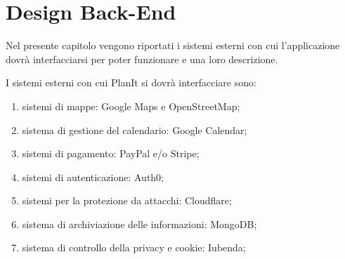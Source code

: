 \section{Design Back-End}
\label{secD1:RequisitiBackEnd}

Nel presente capitolo vengono riportati i sistemi esterni con cui l'applicazione dovrà interfacciarsi per poter funzionare e una loro descrizione.

I sistemi esterni con cui PlanIt si dovrà interfacciare sono:
\begin{enumerate}
    \item sistemi di mappe: Google Maps e OpenStreetMap;
    \item sistema di gestione del calendario: Google Calendar;
    \item sistemi di pagamento: PayPal e/o Stripe;
    \item sistemi di autenticazione: Auth0;
    \item sistemi per la protezione da attacchi: Cloudflare;
    \item sistema di archiviazione delle informazioni: MongoDB;
    \item sistema di controllo della privacy e cookie: Iubenda;
\end{enumerate}

